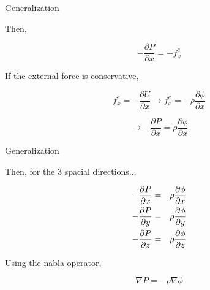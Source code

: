 \documentclass[]{beamer}
\begin{document}

\begin{frame}
  \textcolor{mypink1}{Generalization}
  \vspace{5mm}

Then,

\begin{equation*}
-\frac{\partial P}{\partial x}=-f^{e}_x
\end{equation*}



\pause

If the external force is conservative,

\begin{equation*}
f^e_x=-\frac{\partial U}{\partial x}\rightarrow f^e_x=-\rho\frac{\partial \phi}{\partial x}
\end{equation*}
\pause

\begin{equation*}
\rightarrow-\frac{\partial P}{\partial x}=\rho \frac{\partial \phi}{\partial x}
\end{equation*}

 

  \end{frame}





\begin{frame}
  \textcolor{mypink1}{Generalization}
  \vspace{5mm}

Then, for the 3 spacial directions...


\begin{eqnarray*}
-\frac{\partial P}{\partial x}&=&\rho \frac{\partial \phi}{\partial x}\\
\vspace{3mm}
-\frac{\partial P}{\partial y}&=&\rho \frac{\partial \phi}{\partial y}\\
\vspace{3mm}
-\frac{\partial P}{\partial z}&=&\rho \frac{\partial \phi}{\partial z}\\
\end{eqnarray*}
\pause

Using the nabla operator,


\begin{equation}
\nabla P=-\rho \nabla \phi
\end{equation}


  \end{frame}
\end{document}
